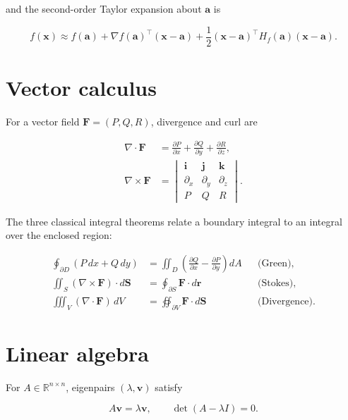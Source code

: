 \documentclass{article}
\begin{document}
and the second-order Taylor expansion about $\mathbf{a}$ is

\begin{equation}
  f(\mathbf{x}) \approx f(\mathbf{a}) + \nabla f(\mathbf{a})^{\!\top} (\mathbf{x} - \mathbf{a})
    + \frac{1}{2} (\mathbf{x} - \mathbf{a})^{\!\top} H_f(\mathbf{a}) (\mathbf{x} - \mathbf{a}).
\end{equation}

\section{Vector calculus}

For a vector field $\mathbf{F} = (P, Q, R)$, divergence and curl are

\begin{align}
  \nabla \cdot \mathbf{F} &= \frac{\partial P}{\partial x} + \frac{\partial Q}{\partial y}
    + \frac{\partial R}{\partial z}, \\
  \nabla \times \mathbf{F} &=
  \begin{vmatrix}
    \mathbf{i} & \mathbf{j} & \mathbf{k} \\
    \partial_x & \partial_y & \partial_z \\
    P & Q & R
  \end{vmatrix}.
\end{align}

The three classical integral theorems relate a boundary integral to an
integral over the enclosed region:

\begin{align}
  \oint_{\partial D} (P \, dx + Q \, dy) &= \iint_D \left( \frac{\partial Q}{\partial x}
    - \frac{\partial P}{\partial y} \right) dA
    && \text{(Green)}, \\
  \iint_S (\nabla \times \mathbf{F}) \cdot d\mathbf{S} &= \oint_{\partial S} \mathbf{F} \cdot d\mathbf{r}
    && \text{(Stokes)}, \\
  \iiint_V (\nabla \cdot \mathbf{F}) \, dV &= \oiint_{\partial V} \mathbf{F} \cdot d\mathbf{S}
    && \text{(Divergence)}.
\end{align}

\section{Linear algebra}

For $A \in \mathbb{R}^{n \times n}$, eigenpairs $(\lambda, \mathbf{v})$ satisfy

\begin{equation}
  A \mathbf{v} = \lambda \mathbf{v}, \qquad \det(A - \lambda I) = 0.
\end{equation}
\end{document}
